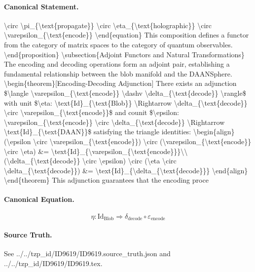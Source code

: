 \paragraph{Canonical Statement.}
\textbackslash{}circ \textbackslash{}pi\_\{\textbackslash{}text\{propagate\}\} \textbackslash{}circ \textbackslash{}eta\_\{\textbackslash{}text\{holographic\}\} \textbackslash{}circ \textbackslash{}varepsilon\_\{\textbackslash{}text\{encode\}\} \textbackslash{}end\{equation\} This composition defines a functor from the category of matrix spaces to the category of quantum observables. \textbackslash{}end\{proposition\} \textbackslash{}subsection\{Adjoint Functors and Natural Transformations\} The encoding and decoding operations form an adjoint pair, establishing a fundamental relationship between the blob manifold and the DAANSphere. \textbackslash{}begin\{theorem\}[Encoding-Decoding Adjunction] There exists an adjunction \$\textbackslash{}langle \textbackslash{}varepsilon\_\{\textbackslash{}text\{encode\}\} \textbackslash{}dashv \textbackslash{}delta\_\{\textbackslash{}text\{decode\}\} \textbackslash{}rangle\$ with unit \$\textbackslash{}eta: \textbackslash{}text\{Id\}\_\{\textbackslash{}text\{Blob\}\} \textbackslash{}Rightarrow \textbackslash{}delta\_\{\textbackslash{}text\{decode\}\} \textbackslash{}circ \textbackslash{}varepsilon\_\{\textbackslash{}text\{encode\}\}\$ and counit \$\textbackslash{}epsilon: \textbackslash{}varepsilon\_\{\textbackslash{}text\{encode\}\} \textbackslash{}circ \textbackslash{}delta\_\{\textbackslash{}text\{decode\}\} \textbackslash{}Rightarrow \textbackslash{}text\{Id\}\_\{\textbackslash{}text\{DAAN\}\}\$ satisfying the triangle identities: \textbackslash{}begin\{align\} (\textbackslash{}epsilon \textbackslash{}circ \textbackslash{}varepsilon\_\{\textbackslash{}text\{encode\}\}) \textbackslash{}circ (\textbackslash{}varepsilon\_\{\textbackslash{}text\{encode\}\} \textbackslash{}circ \textbackslash{}eta) \&= \textbackslash{}text\{Id\}\_\{\textbackslash{}varepsilon\_\{\textbackslash{}text\{encode\}\}\}\textbackslash{}\textbackslash{} (\textbackslash{}delta\_\{\textbackslash{}text\{decode\}\} \textbackslash{}circ \textbackslash{}epsilon) \textbackslash{}circ (\textbackslash{}eta \textbackslash{}circ \textbackslash{}delta\_\{\textbackslash{}text\{decode\}\}) \&= \textbackslash{}text\{Id\}\_\{\textbackslash{}delta\_\{\textbackslash{}text\{decode\}\}\} \textbackslash{}end\{align\} \textbackslash{}end\{theorem\} This adjunction guarantees that the encoding proce

\paragraph{Canonical Equation.}
\[
\eta: \text{Id}_{\text{Blob}} \Rightarrow \delta_{\text{decode}} \circ \varepsilon_{\text{encode}}
\]

\paragraph{Source Truth.}
See ../../tzp\_id/ID9619/ID9619.source\_truth.json and ../../tzp\_id/ID9619/ID9619.tex.
